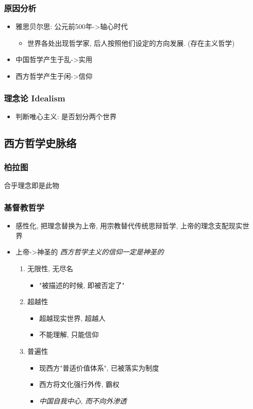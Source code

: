 \documentclass[11pt]{article}
\begin{document}
\subsubsection{原因分析}
\label{sec:org10904ed}
\begin{itemize}
\item 雅思贝尔思: 公元前500年->轴心时代
\begin{itemize}
\item 世界各处出现哲学家, 后人按照他们设定的方向发展. (存在主义哲学)
\end{itemize}
\item 中国哲学产生于乱->实用
\item 西方哲学产生于闲->信仰
\end{itemize}

\subsubsection{理念论 Idealism}
\label{sec:org70e622b}
\begin{itemize}
\item 判断唯心主义: 是否划分两个世界
\end{itemize}

\subsection{西方哲学史脉络}
\label{sec:org5f6bbf3}
\subsubsection{柏拉图}
\label{sec:org2b096e2}
合乎理念即是此物
\subsubsection{基督教哲学}
\label{sec:orgd2ec4c3}
\begin{itemize}
\item 感性化, 把理念替换为上帝, 用宗教替代传统思辩哲学, 上帝的理念支配现实世界
\item 上帝->神圣的
\emph{西方哲学主义的信仰一定是神圣的}
\begin{enumerate}
\item 无限性, 无尽名
\begin{itemize}
\item "被描述的时候, 即被否定了"
\end{itemize}
\item 超越性
\begin{itemize}
\item 超越现实世界, 超越人
\item 不能理解, 只能信仰
\end{itemize}
\item 普遍性
\begin{itemize}
\item 现西方"普适价值体系", 已被落实为制度
\item 西方将文化强行外传, 霸权
\item \emph{中国自我中心, 而不向外渗透}
\end{itemize}
\end{enumerate}
\end{itemize}
\end{document}
